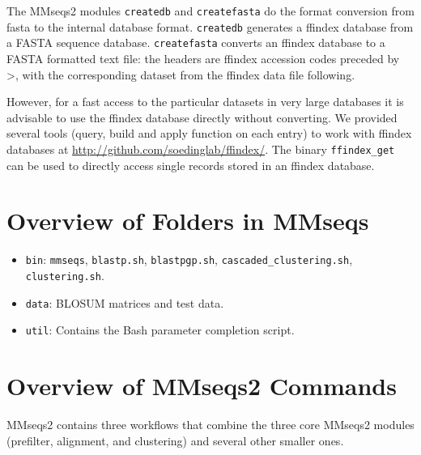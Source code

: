 \documentclass[11pt,a4paper]{scrreprt}
\begin{document}


The MMseqs2 modules \texttt{createdb} and \texttt{createfasta} do the format conversion from fasta to the internal database format. 
\texttt{createdb} generates a ffindex database from a FASTA sequence database. 
\texttt{createfasta} converts an ffindex database to a FASTA formatted text file: the headers are ffindex accession codes preceded by \textgreater, with the corresponding dataset from the ffindex data file following.


However, for a fast access to the particular datasets in very large databases it is advisable to use the ffindex database directly without converting. We provided several tools (query, build and apply function on each entry) to work with ffindex databases at \url{http://github.com/soedinglab/ffindex/}. The binary \texttt{ffindex\_get} can be used to directly access single records stored in an ffindex database.
\section{Overview of Folders in MMseqs}
\begin{itemize}
\item \texttt{bin}: \texttt{mmseqs}, \texttt{blastp.sh}, \texttt{blastpgp.sh}, \texttt{cascaded\_clustering.sh}, \texttt{clustering.sh}.
\item \texttt{data}: BLOSUM matrices and test data.
\item \texttt{util}: Contains the Bash parameter completion script.
\end{itemize}


\section{Overview of MMseqs2 Commands}
MMseqs2 contains three workflows that combine the three core MMseqs2 modules (prefilter, alignment, and clustering) and several other smaller ones. 
\end{document}
